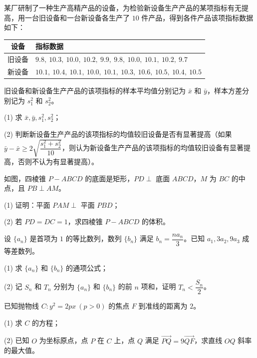 \begin{question}
某厂研制了一种生产高精产品的设备，为检验新设备生产产品的某项指标有无提高，用一台旧设备和一台新设备各生产了 $10$ 件产品，得到各件产品该项指标数据如下：

\begin{center}
\begin{tabular}{cl}
\toprule
设备 & 指标数据 \\
\midrule
旧设备 & $9.8,\ 10.3,\ 10.0,\ 10.2,\ 9.9,\ 9.8,\ 10.0,\ 10.1,\ 10.2,\ 9.7$ \\
新设备 & $10.1,\ 10.4,\ 10.1,\ 10.0,\ 10.1,\ 10.3,\ 10.6,\ 10.5,\ 10.4,\ 10.5$ \\
\bottomrule
\end{tabular}
\end{center}

旧设备和新设备生产产品的该项指标的样本平均值分别记为 $\bar x$ 和 $\bar y$，样本方差分别记为 $s_1^2$ 和 $s_2^2$。

(1) 求 $\bar x,\bar y,s_1^2,s_2^2$；

(2) 判断新设备生产产品的该项指标的均值较旧设备是否有显著提高（如果 $\bar y-\bar x\geqslant2\sqrt{\dfrac{s_1^2+s_2^2}{10}}$，则认为新设备生产产品的该项指标的均值较旧设备有显著提高，否则不认为有显著提高）。

\Needspace{0.4\textheight}
\end{question}
\begin{question}
如图，四棱锥 $P-ABCD$ 的底面是矩形，$PD\perp$ 底面 $ABCD$，$M$ 为 $BC$ 的中点，且 $PB\perp AM$。
\nopagebreak[4]
\begin{center}\end{center}
\nopagebreak[4]
(1) 证明：平面 $PAM\perp$ 平面 $PBD$；

(2) 若 $PD=DC=1$，求四棱锥 $P-ABCD$ 的体积。

\end{question}
\begin{question}
设 $\{a_n\}$ 是首项为 $1$ 的等比数列，数列 $\{b_n\}$ 满足 $b_n=\dfrac{na_n}{3}$。已知 $a_1,3a_2,9a_3$ 成等差数列。

(1) 求 $\{a_n\}$ 和 $\{b_n\}$ 的通项公式；

(2) 记 $S_n$ 和 $T_n$ 分别为 $\{a_n\}$ 和 $\{b_n\}$ 的前 $n$ 项和，证明 $T_n<\dfrac{S_n}{2}$。

\Needspace{0.4\textheight}

\end{question}
\begin{question}
已知抛物线 $C:y^2=2px\ (p>0)$ 的焦点 $F$ 到准线的距离为 $2$。

(1) 求 $C$ 的方程；

(2) 已知 $O$ 为坐标原点，点 $P$ 在 $C$ 上，点 $Q$ 满足 $\overrightarrow{PQ}=9\overrightarrow{QF}$，求直线 $OQ$ 斜率的最大值。

\end{question}
